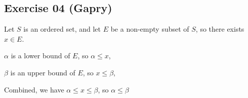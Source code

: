 \subsection*{Exercise 04 (Gapry)}
Let $S$ is an ordered set, and let $E$ be a non-empty subset of $S$, so there exists $x \in E$.

$\alpha$ is a lower bound of $E$, so $\alpha \le x$,

$\beta$ is an upper bound of $E$, so $x \le \beta$,

Combined, we have $\alpha \le x \le \beta$, so $\alpha \le \beta$